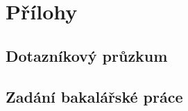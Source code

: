 \appendix
{} \thispagestyle{empty}
\renewcommand{\appendixname}{P\v{r}iloha}%


\part*{Přílohy}

\chapter[\noindent Dotazníkový průzkum]{\noindent Dotazníkový průzkum}



\chapter[\noindent Zadání bakalářské práce]{\noindent Zadání bakalářské práce}

